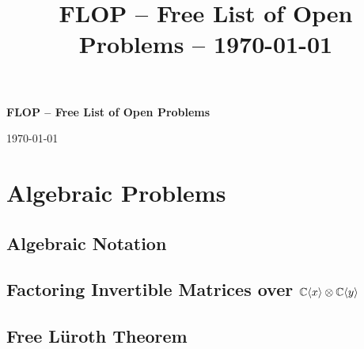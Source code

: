 \documentclass[oneside]{amsbook}
\title{FLOP -- Free List of Open Problems -- \today}
\numberwithin{equation}{section}
\begin{document}
\begin{center}
	\textbf{\huge{FLOP -- Free List of Open Problems}}
	
	\huge{\today}
\end{center}
\tableofcontents









\chapter{Algebraic Problems}

\section{Algebraic Notation}






\section{Factoring Invertible Matrices over $\mathbb{C}\langle x \rangle\otimes \mathbb{C}\langle y \rangle$}
	\label{sec:Elem_Mats}



\bigskip





\section{Free L{\"u}roth Theorem}
	\label{sec:Luroth}

\end{document}
